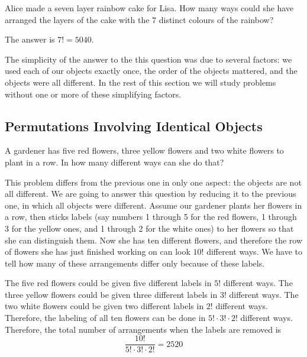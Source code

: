 \documentclass[11pt,a4paper]{book}
\begin{document}
\begin{example}

Alice made a seven layer rainbow cake for Lisa. How many ways could
she have arranged the layers of the cake with the $7$ distinct colours
of the rainbow?

\Solution

The answer is $7!=5040$. 

\end{example}

The simplicity of the answer to the this question was due to several
factors: we used each of our objects exactly once, the order of the
objects mattered, and the objects were all different. In the rest
of this section we will study problems without one or more of these
simplifying factors. 

\subsection{Permutations Involving Identical Objects}

\begin{example}

A gardener has five red flowers, three yellow flowers and two white
flowers to plant in a row. In how many different ways can she do that?

\Solution

This problem differs from the previous one in only one aspect: the
objects are not all different. We are going to answer this question
by reducing it to the previous one, in which all objects were different.
Assume our gardener plants her flowers in a row, then sticks labels
(say numbers 1 through 5 for the red flowers, 1 through 3 for the
yellow ones, and 1 through 2 for the white ones) to her flowers so
that she can distinguish them. Now she has ten different flowers,
and therefore the row of flowers she has just finished working on
can look $10!$ different ways. We have to tell how many of these
arrangements differ only because of these labels.

The five red flowers could be given five different labels in $5!$
different ways. The three yellow flowers could be given three different
labels in $3!$ different ways. The two white flowers could be given
two different labels in $2!$ different ways. Therefore, the labeling
of all ten flowers can be done in $5!\cdot3!\cdot2!$ different ways.
Therefore, the total number of arrangements when the labels are removed
is
\[
\frac{10!}{5!\cdot3!\cdot2!}=2520
\]

\end{example}
\end{document}
